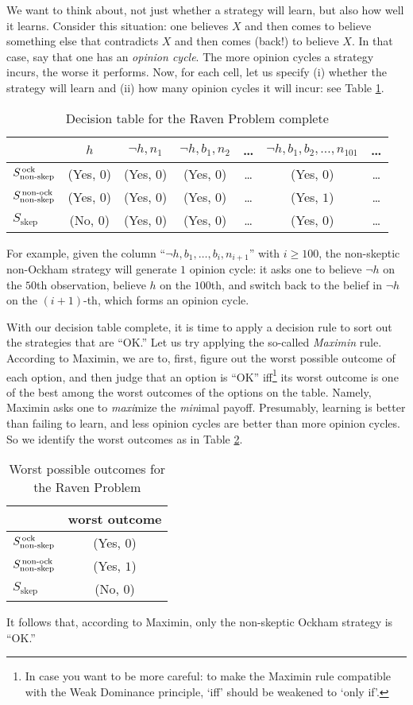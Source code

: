 We want to think about, not just whether a strategy will learn, but also how well it learns. Consider this situation: one believes $X$ and then comes to believe something else that contradicts $X$ and then comes (back!) to believe $X$. In that case, say that one has an {\em opinion cycle}. The more opinion cycles a strategy incurs, the worse it performs. Now, for each cell, let us specify (i) whether the strategy will learn and (ii) how many opinion cycles it will incur: see Table \ref{lin-table3}.
\begin{table}[ht]
\centering
\begin{tabular}{lcccccc}
	& $h$ & $\neg h, n_1$ & $\neg h, b_1, n_2$ & \ldots & $\neg h, b_1, b_2, \ldots, n_{101}$ & \ldots \\
	\hline\hline
	$S_{\textrm{non-skep}}^{\textrm{\,ock}}$ & (Yes, $0$) & (Yes, $0$) & (Yes, $0$) & \ldots & (Yes, $0$) & \ldots \\
  	$S_{\textrm{non-skep}}^{\textrm{\,non-ock}}$ & (Yes, $0$) & (Yes, $0$) & (Yes, $0$) & \ldots & (Yes, $1$) & \ldots \\
  	$S_{\textrm{skep}}$ & (No, $0$) & (Yes, $0$) & (Yes, $0$) & \ldots & (Yes, $0$) & \ldots 
\end{tabular}
\caption{Decision table for the Raven Problem complete}\label{lin-table3}
\end{table}
For example, given the column ``$\neg h, b_1, \dots, b_i, n_{i+1}$'' with $i \ge 100$, the non-skeptic non-Ockham strategy will generate $1$ opinion cycle: it asks one to believe $\neg h$ on the $50$th observation, believe $h$ on the $100$th, and switch back to the belief in $\neg h$ on the $(i+1)$-th, which forms an opinion cycle. 

With our decision table complete, it is time to apply a decision rule to sort out the strategies that are ``OK.'' Let us try applying the so-called {\em Maximin} rule. According to Maximin, we are to, first, figure out the worst possible outcome of each option, and then judge that an option is ``OK'' iff\footnote
	{In case you want to be more careful: to make the Maximin rule compatible with the Weak Dominance principle, `iff' should be weakened to `only if'.} 
its worst outcome is one of the best among the worst outcomes of the options on the table. Namely, Maximin asks one to {\em maxi}mize the {\em min}imal payoff. Presumably, learning is better than failing to learn, and less opinion cycles are better than more opinion cycles. So we identify the worst outcomes as in Table \ref{lin-table4}.
\begin{table}[ht]
\centering
\begin{tabular}{lc}
	& worst outcome
\\ \hline\hline
  	$S_{\textrm{non-skep}}^{\textrm{\,ock}}$ & (Yes, $0$) \\
  	$S_{\textrm{non-skep}}^{\textrm{\,non-ock}}$ & (Yes, $1$) \\
  	$S_{\textrm{skep}}$ & (No, $0$)
\end{tabular}
\caption{Worst possible outcomes for the Raven Problem}\label{lin-table4}
\end{table}
It follows that, according to Maximin, only the non-skeptic Ockham strategy is ``OK.''  


